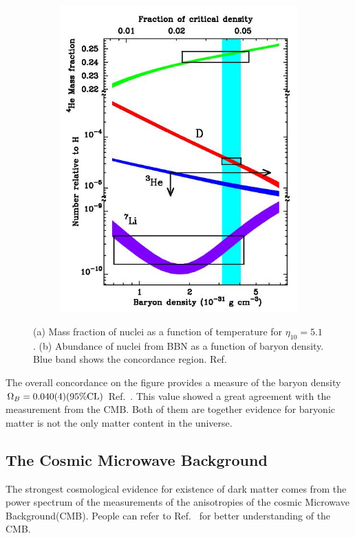 \begin{figure}[p]
\begin{subfigure}[b]{\figurewidth}
		\includegraphics[width=\halfwidth,clip,trim={0 0 0 0}]{Figures/Intro/BBNBaryonDensity.jpg}
		\caption{}
		\label{fig:BBNb}
	\end{subfigure}
	\caption[Big Bang nucleosynthesis: mass fraction and abundance of nuclei]{(a) Mass fraction of nuclei as a function of temperature for $\eta_{10} = 5.1$. (b) Abundance of nuclei from BBN as a function of baryon density. Blue band shows the concordance region. Ref.~\cite{Tytler2000}} 
	\label{fig:BBN}
\end{figure}

The overall concordance on the figure provides a measure of the baryon density $\Omega_{B} =\num[separate-uncertainty=false]{0.040 +- 0.004} (95\% \text{CL})$ Ref.~\cite{Burles1998, Burles2001}. This value showed a great agreement with the measurement from the CMB. Both of them are together evidence for baryonic matter is not the only matter content in the universe.  

\subsection{The Cosmic Microwave Background}
The strongest cosmological evidence for existence of dark matter comes from the power spectrum of the measurements of the anisotropies of the cosmic Microwave Background(CMB). People can refer to Ref.~\cite{Olive2014} for better understanding of the CMB.

